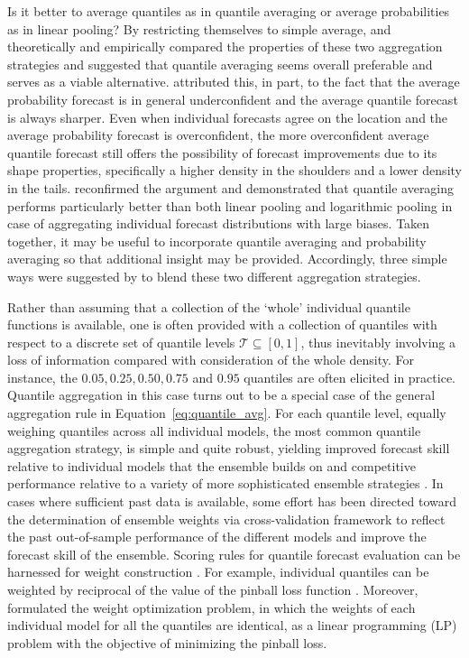 \documentclass[11pt]{article}
\begin{document}
Is it better to average quantiles as in quantile averaging or average probabilities as in linear pooling? By restricting themselves to simple average, \cite{Lichtendahl2013-rt} and \cite{Busetti2017-ox} theoretically and empirically compared the properties of these two aggregation strategies and suggested that quantile averaging seems overall preferable and serves as a viable alternative. \cite{Lichtendahl2013-rt} attributed this, in part, to the fact that the average probability forecast is in general underconfident and the average quantile forecast is always sharper. Even when individual forecasts agree on the location and the average probability forecast is overconfident, the more overconfident average quantile forecast still offers the possibility of forecast improvements due to its shape properties, specifically a higher density in the shoulders and a lower density in the tails. \cite{Busetti2017-ox} reconfirmed the argument and demonstrated that quantile averaging performs particularly better than both linear pooling and logarithmic pooling in case of aggregating individual forecast distributions with large biases. Taken together, it may be useful to incorporate quantile averaging and probability averaging so that additional insight may be provided. Accordingly, three simple ways were suggested by \cite{Lichtendahl2013-rt} to blend these two different aggregation strategies.

Rather than assuming that a collection of the `whole' individual quantile functions is available, one is often provided with a collection of quantiles with respect to a discrete set of quantile levels $\mathcal{T} \subseteq [0,1]$, thus inevitably involving a loss of information compared with consideration of the whole density. For instance, the $0.05, 0.25, 0.50, 0.75$ and $0.95$ quantiles are often elicited in practice. Quantile aggregation in this case turns out to be a special case of the general aggregation rule in Equation~\eqref{eq:quantile_avg}. For each quantile level, equally weighing quantiles across all individual models, the most common quantile aggregation strategy, is simple and quite robust, yielding improved forecast skill relative to individual models that the ensemble builds on and competitive performance relative to a variety of more sophisticated ensemble strategies \citep[e.g.,][]{Busetti2017-ox,Smyl2019-av,Brooks2020-sg,Ray2020-qg}. In cases where sufficient past data is available, some effort has been directed toward the determination of ensemble weights via cross-validation framework to reflect the past out-of-sample performance of the different models and improve the forecast skill of the ensemble. Scoring rules for quantile forecast evaluation can be harnessed for weight construction \citep{Gneiting2007-ij,Grushka-Cockayne2017-eg}. For example, individual quantiles can be weighted by reciprocal of the value of the pinball loss function \citep{Wang2019-lx,Zhang2020-dm}. Moreover, \cite{Wang2019-lx} formulated the weight optimization problem, in which the weights of each individual model for all the quantiles are identical, as a linear programming (LP) problem with the objective of minimizing the pinball loss.
\end{document}
